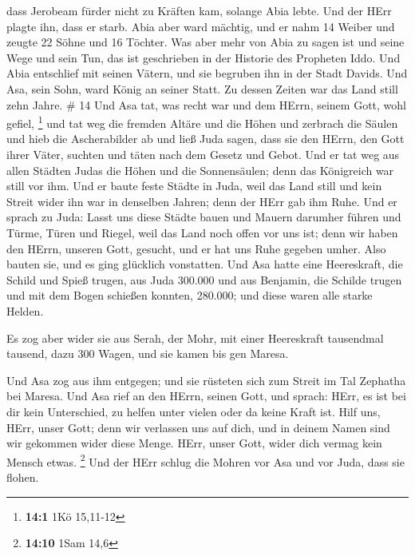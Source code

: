  dass Jerobeam fürder nicht zu Kräften kam, solange Abia
lebte. Und der HErr plagte ihn, dass er starb.  Abia aber
ward mächtig, und er nahm 14 Weiber und zeugte 22 Söhne und 16 Töchter.
 Was aber mehr von Abia zu sagen ist und seine Wege und
sein Tun, das ist geschrieben in der Historie des Propheten Iddo.
 Und Abia entschlief mit seinen Vätern, und sie begruben
ihn in der Stadt Davids. Und Asa, sein Sohn, ward König an seiner Statt.
Zu dessen Zeiten war das Land still zehn Jahre. \# 14  Und
Asa tat, was recht war und dem HErrn, seinem Gott, wohl gefiel,
\footnote{\textbf{14:1} 1Kö 15,11-12}  und tat weg die
fremden Altäre und die Höhen und zerbrach die Säulen und hieb die
Ascherabilder ab  und ließ Juda sagen, dass sie den HErrn,
den Gott ihrer Väter, suchten und täten nach dem Gesetz und Gebot.
 Und er tat weg aus allen Städten Judas die Höhen und die
Sonnensäulen; denn das Königreich war still vor ihm.  Und er
baute feste Städte in Juda, weil das Land still und kein Streit wider
ihn war in denselben Jahren; denn der HErr gab ihm Ruhe. 
Und er sprach zu Juda: Lasst uns diese Städte bauen und Mauern darumher
führen und Türme, Türen und Riegel, weil das Land noch offen vor uns
ist; denn wir haben den HErrn, unseren Gott, gesucht, und er hat uns
Ruhe gegeben umher. Also bauten sie, und es ging glücklich vonstatten.
 Und Asa hatte eine Heereskraft, die Schild und Spieß
trugen, aus Juda 300.000 und aus Benjamin, die Schilde trugen und mit
dem Bogen schießen konnten, 280.000; und diese waren alle starke Helden.

 Es zog aber wider sie aus Serah, der Mohr, mit einer
Heereskraft tausendmal tausend, dazu 300 Wagen, und sie kamen bis gen
Maresa.

 Und Asa zog aus ihm entgegen; und sie rüsteten sich zum
Streit im Tal Zephatha bei Maresa.  Und Asa rief an den
HErrn, seinen Gott, und sprach: HErr, es ist bei dir kein Unterschied,
zu helfen unter vielen oder da keine Kraft ist. Hilf uns, HErr, unser
Gott; denn wir verlassen uns auf dich, und in deinem Namen sind wir
gekommen wider diese Menge. HErr, unser Gott, wider dich vermag kein
Mensch etwas. \footnote{\textbf{14:10} 1Sam 14,6}  Und der
HErr schlug die Mohren vor Asa und vor Juda, dass sie flohen.

